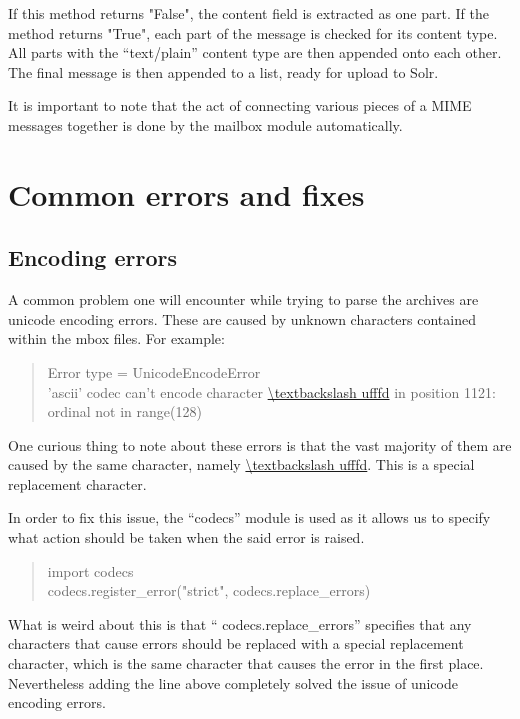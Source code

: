 \documentclass[a4paper,english]{report}
\begin{document}
If this method returns "False", the content field is extracted as one part. If the method returns "True", each part of the message is checked for its content type. All parts with the “text/plain” content type are then appended onto each other.
The final message is then appended to a list, ready for upload to Solr. 

It is important to note that the act of connecting various pieces of a MIME messages together is done by the mailbox module automatically. 



\begin{center}



\end{center}

\section{Common errors and fixes}

\subsection{Encoding errors}

A common problem one will encounter while trying to parse the archives  are unicode encoding errors. These are caused by unknown characters contained within the mbox files.  
For example:\\

\begin{quotation}
\noindent
Error type = UnicodeEncodeError\\
'ascii' codec can't encode character \url{\textbackslash ufffd} in position 1121: ordinal not in range(128)
\end{quotation}

One curious thing to note about these errors is that the vast majority of them are caused by the same character, namely \url{\textbackslash ufffd}. This is  a special replacement character.

In order to fix this issue, the “codecs” module is used as it allows us to specify what action should be taken when the said error is raised.\\ 
\begin{quotation}
\noindent
import codecs\\
codecs.register\_error("strict", codecs.replace\_errors)\\
\end{quotation}
What is weird about this is that “ codecs.replace\_errors” specifies that any characters that cause errors should be replaced with a special replacement character, which is the same character that causes the error in the first place.\\
Nevertheless adding the line above completely solved the issue of unicode encoding errors.
\end{document}
